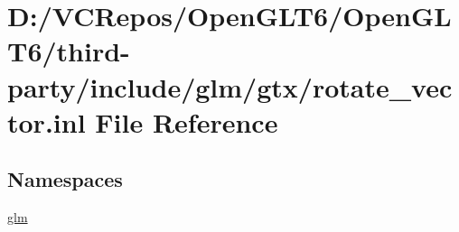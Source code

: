 \hypertarget{rotate__vector_8inl}{}\section{D\+:/\+V\+C\+Repos/\+Open\+G\+L\+T6/\+Open\+G\+L\+T6/third-\/party/include/glm/gtx/rotate\+\_\+vector.inl File Reference}
\label{rotate__vector_8inl}
\subsection*{Namespaces}
\begin{DoxyCompactItemize}
\item 
 \mbox{\hyperlink{namespaceglm}{glm}}
\end{DoxyCompactItemize}

